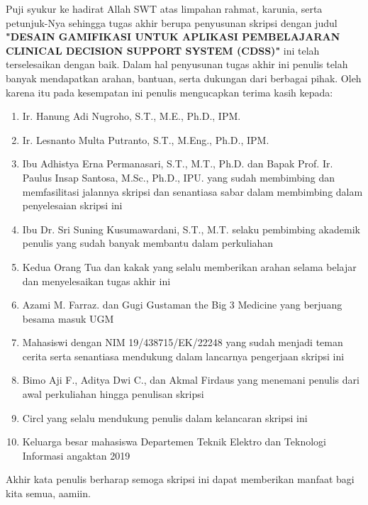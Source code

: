 
Puji syukur ke hadirat Allah SWT atas limpahan rahmat, karunia, serta petunjuk-Nya sehingga tugas akhir berupa penyusunan skripsi 
dengan judul \textbf{"DESAIN GAMIFIKASI UNTUK APLIKASI PEMBELAJARAN CLINICAL DECISION SUPPORT SYSTEM (CDSS)"}
ini telah terselesaikan dengan baik. Dalam hal penyusunan tugas akhir ini penulis telah banyak mendapatkan arahan, bantuan, serta dukungan dari berbagai pihak. 
Oleh karena itu pada kesempatan ini penulis mengucapkan terima kasih kepada:

\begin{enumerate}
	\item Ir. Hanung Adi Nugroho, S.T., M.E., Ph.D., IPM.
	\item Ir. Lesnanto Multa Putranto, S.T., M.Eng., Ph.D., IPM.
	\item Ibu Adhistya Erna Permanasari, S.T., M.T., Ph.D. dan Bapak Prof. Ir. Paulus Insap Santosa, M.Sc., Ph.D., IPU. yang sudah membimbing dan memfasilitasi jalannya skripsi dan senantiasa sabar dalam membimbing dalam penyelesaian skripsi ini
	\item Ibu Dr. Sri Suning Kusumawardani, S.T., M.T. selaku pembimbing akademik penulis yang sudah banyak membantu dalam perkuliahan
	\item Kedua Orang Tua dan kakak yang selalu memberikan arahan selama belajar dan menyelesaikan tugas akhir ini
	\item Azami M. Farraz. dan Gugi Gustaman the Big 3 Medicine yang berjuang besama masuk UGM
	\item Mahasiswi dengan NIM 19/438715/EK/22248 yang sudah menjadi teman cerita serta senantiasa mendukung dalam lancarnya pengerjaan skripsi ini
	\item Bimo Aji F., Aditya Dwi C., dan Akmal Firdaus yang menemani penulis dari awal perkuliahan hingga penulisan skripsi
	\item Circl yang selalu mendukung penulis dalam kelancaran skripsi ini
	\item Keluarga besar mahasiswa Departemen Teknik Elektro dan Teknologi Informasi angaktan 2019
\end{enumerate}

Akhir kata penulis berharap semoga skripsi ini dapat memberikan manfaat bagi kita semua, aamiin.

